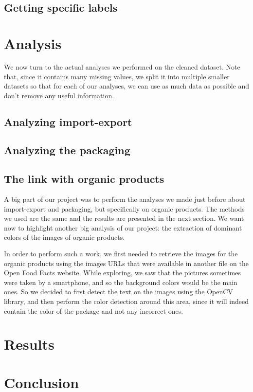 \documentclass[11pt]{article}
\begin{document}
\subsection{Getting specific labels}

\section{Analysis}

We now turn to the actual analyses we performed on the cleaned dataset. Note that, since it contains many missing values, we split it into multiple smaller datasets so that for each of our analyses, we can use as much data as possible and don't remove any useful information.

\subsection{Analyzing import-export}


\subsection{Analyzing the packaging}


\subsection{The link with organic products}
A big part of our project was to perform the analyses we made just before about import-export and packaging, but specifically on organic products. The methods we used are the same and the results are presented in the next section.
We want now to highlight another big analysis of our project: the extraction of dominant colors of the images of organic products.

In order to perform such a work, we first needed to retrieve the images for the organic products using the images URLs that were available in another file on the Open Food Facts website. While exploring, we saw that the pictures sometimes were taken by a smartphone, and so the background colors would be the main ones. So we decided to first detect the text on the images using the OpenCV library, and then perform the color detection around this area, since it will indeed contain the color of the package and not any incorrect ones.


\section{Results}


\section{Conclusion}
\end{document}
